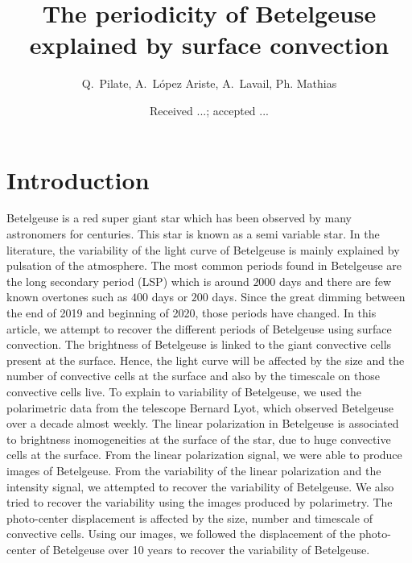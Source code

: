 \documentclass{aa}
\begin{document}
 


   \title{The periodicity of Betelgeuse explained by surface convection}


    \author{{ Q.~Pilate},{ A.~L{\'o}pez Ariste},{ A.~Lavail},{ Ph. Mathias} }


   \date{Received ...; accepted ...}

 
  \abstract


   \keywords{
               }

   \maketitle
%

\section{Introduction}
Betelgeuse is a red super giant star which has been observed by many astronomers for centuries. This star is known as a semi variable star. In the literature, the variability of the light curve of Betelgeuse is mainly explained by pulsation of the atmosphere. The most common periods found in Betelgeuse are the long secondary period (LSP) which is around $2000$ days and there are few known overtones such as $400$ days or $200$ days. Since the great dimming between the end of 2019 and beginning of 2020, those periods have changed. In this article, we attempt to recover the different periods of Betelgeuse using surface convection. The brightness of Betelgeuse is linked to the giant convective cells present at the surface. Hence, the light curve will be affected by the size and the number of convective cells at the surface and also by the timescale on those convective cells live. To explain to variability of Betelgeuse, we used the polarimetric data from the telescope Bernard Lyot, which observed Betelgeuse over a decade almost weekly. The linear polarization in Betelgeuse is associated to brightness inomogeneities at the surface of the star, due to huge convective cells at the surface. From the linear polarization signal, we were able to produce images of Betelgeuse. From the variability of the linear polarization and the intensity signal, we attempted to recover the variability of Betelgeuse. We also tried to recover the variability using the images produced by polarimetry. The photo-center displacement is affected by the size, number and timescale of convective cells. Using our images, we followed the displacement of the photo-center of Betelgeuse over 10 years to recover the variability of Betelgeuse. 
\end{document}
